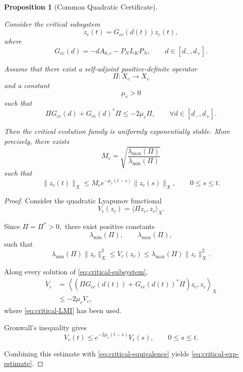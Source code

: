 \documentclass[pdflatex,sn-mathphys-num]{sn-jnl}
\theoremstyle{thmstyleone}%
\newtheorem{proposition}[theorem]{Proposition}%
\theoremstyle{thmstyletwo}%
\theoremstyle{thmstylethree}%
\begin{document}
\begin{proposition}[Common Quadratic Certificate]
\label{prop:critical-quadratic-certificate}

Consider the critical subsystem
\begin{equation}
\dot z_c(t)
=
G_{cc}(d(t))z_c(t),
\label{eq:critical-subsystem}
\end{equation}
where
\[
G_{cc}(d)
=
-dA_{0,c}
-
P_NL_KP_N,
\qquad
d\in[d_-,d_+].
\]

Assume that there exist a self-adjoint positive-definite operator
\[
\Pi:X_c\rightarrow X_c
\]
and a constant
\[
\mu_c>0
\]
such that
\begin{equation}
\Pi G_{cc}(d)
+
G_{cc}(d)^*\Pi
\le
-2\mu_c\Pi,
\qquad
\forall d\in[d_-,d_+].
\label{eq:critical-LMI}
\end{equation}

Then the critical evolution family is uniformly exponentially stable.
More precisely, there exists
\[
M_c
=
\sqrt{
\frac{\lambda_{\max}(\Pi)}
{\lambda_{\min}(\Pi)}
}
\]
such that
\begin{equation}
\|z_c(t)\|_X
\le
M_c
e^{-\mu_c(t-s)}
\|z_c(s)\|_X,
\qquad
0\le s\le t.
\label{eq:critical-exp-estimate}
\end{equation}

\end{proposition}

\begin{proof}

Consider the quadratic Lyapunov functional
\[
V_c(z_c)
=
\langle
\Pi z_c,
z_c
\rangle_X.
\]

Since
\(
\Pi=\Pi^*>0,
\)
there exist positive constants
\[
\lambda_{\min}(\Pi),
\qquad
\lambda_{\max}(\Pi),
\]
such that
\begin{equation}
\lambda_{\min}(\Pi)\|z_c\|_X^2
\le
V_c(z_c)
\le
\lambda_{\max}(\Pi)\|z_c\|_X^2.
\label{eq:critical-equivalence}
\end{equation}

Along every solution of
\eqref{eq:critical-subsystem},
\[
\begin{aligned}
\dot V_c
&=
\left\langle
\left(
\Pi G_{cc}(d(t))
+
G_{cc}(d(t))^*\Pi
\right)
z_c,
z_c
\right\rangle_X
\\
&\le
-2\mu_cV_c,
\end{aligned}
\]
where \eqref{eq:critical-LMI} has been used.

Gronwall's inequality gives
\[
V_c(t)
\le
e^{-2\mu_c(t-s)}
V_c(s),
\qquad
0\le s\le t.
\]

Combining this estimate with
\eqref{eq:critical-equivalence}
yields
\eqref{eq:critical-exp-estimate}.

\end{proof}
\end{document}
